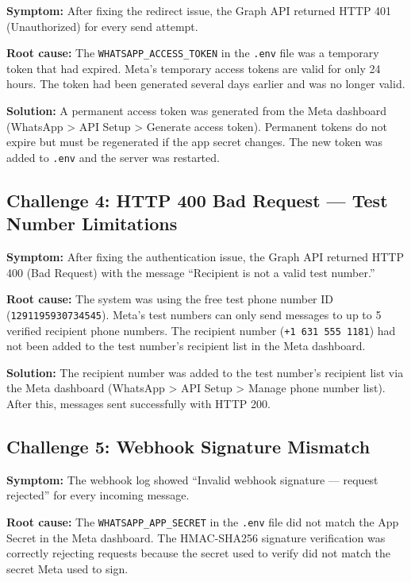 \documentclass[12pt, a4paper]{report}
\begin{document}
\textbf{Symptom:} After fixing the redirect issue, the Graph API returned HTTP 401 (Unauthorized) for every send attempt.

\textbf{Root cause:} The \texttt{WHATSAPP\_ACCESS\_TOKEN} in the \texttt{.env} file was a temporary token that had expired. Meta's temporary access tokens are valid for only 24 hours. The token had been generated several days earlier and was no longer valid.

\textbf{Solution:} A permanent access token was generated from the Meta dashboard (WhatsApp > API Setup > Generate access token). Permanent tokens do not expire but must be regenerated if the app secret changes. The new token was added to \texttt{.env} and the server was restarted.

\subsection{Challenge 4: HTTP 400 Bad Request --- Test Number Limitations}

\textbf{Symptom:} After fixing the authentication issue, the Graph API returned HTTP 400 (Bad Request) with the message ``Recipient is not a valid test number.''

\textbf{Root cause:} The system was using the free test phone number ID (\texttt{1291195930734545}). Meta's test numbers can only send messages to up to 5 verified recipient phone numbers. The recipient number (\texttt{+1 631 555 1181}) had not been added to the test number's recipient list in the Meta dashboard.

\textbf{Solution:} The recipient number was added to the test number's recipient list via the Meta dashboard (WhatsApp > API Setup > Manage phone number list). After this, messages sent successfully with HTTP 200.

\subsection{Challenge 5: Webhook Signature Mismatch}

\textbf{Symptom:} The webhook log showed ``Invalid webhook signature --- request rejected'' for every incoming message.

\textbf{Root cause:} The \texttt{WHATSAPP\_APP\_SECRET} in the \texttt{.env} file did not match the App Secret in the Meta dashboard. The HMAC-SHA256 signature verification was correctly rejecting requests because the secret used to verify did not match the secret Meta used to sign.
\end{document}
